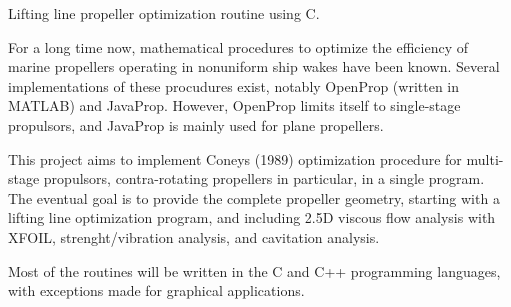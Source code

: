 Lifting line propeller optimization routine using C.

For a long time now, mathematical procedures to optimize the efficiency of marine propellers operating in nonuniform ship wakes have been known. Several implementations of these procudures exist, notably Open\+Prop (written in M\+A\+T\+L\+AB) and Java\+Prop. However, Open\+Prop limits itself to single-\/stage propulsors, and Java\+Prop is mainly used for plane propellers.

This project aims to implement Coney\textquotesingle{}s (1989) optimization procedure for multi-\/stage propulsors, contra-\/rotating propellers in particular, in a single program. The eventual goal is to provide the complete propeller geometry, starting with a lifting line optimization program, and including 2.\+5D viscous flow analysis with X\+F\+O\+IL, strenght/vibration analysis, and cavitation analysis.

Most of the routines will be written in the C and C++ programming languages, with exceptions made for graphical applications. 